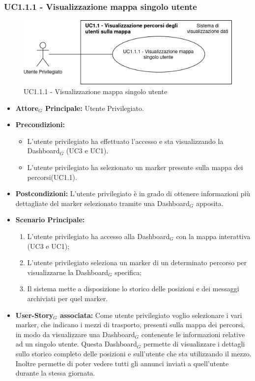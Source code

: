 \documentclass[11pt]{article}
\begin{document}
\begin{justify}
\subsubsection{\textbf{UC1.1.1 - Visualizzazione mappa singolo utente}}
\begin{figure}[H]
    \centering
    \includegraphics[width=0.7\linewidth]{UC1.1.1image.png}
    \caption{UC1.1.1 - Visualizzazione mappa singolo utente}
    \label{fig:UC1.1.1}
\end{figure}
\label{UC1.1.1}
\begin{itemize}
     \item \textbf{Attore$_G$ Principale:} Utente Privilegiato.
     \item \textbf{Precondizioni:}
        \begin{itemize}
    		\item L'utente privilegiato ha effettuato l'accesso e sta      visualizzando la Dashboard$_G$ (UC3 e UC1).
    	        \item L'utente privilegiato ha selezionato un marker  presente sulla mappa dei percorsi(UC1.1).
        \end{itemize}
     \item \textbf{Postcondizioni:} L'utente privilegiato è in grado di ottenere informazioni più dettagliate del marker selezionato tramite una Dashboard$_G$ apposita.
     \item \textbf{Scenario Principale:}
        \begin{enumerate}
            \item L'utente privilegiato ha accesso alla Dashboard$_G$ con la mappa interattiva (UC3 e UC1);
            \item L'utente privilegiato seleziona un marker di un determinato percorso per visualizzarne la Dashboard$_G$ specifica;
            \item Il sistema mette a disposizione lo storico delle posizioni e dei messaggi archiviati per quel marker.
        \end{enumerate}
     \item \textbf{User-Story$_G$ associata:}
     Come utente privilegiato voglio selezionare i vari marker, che indicano i mezzi di trasporto, presenti sulla mappa dei percorsi, in modo da visualizzare una Dashboard$_G$ contenente le informazioni relative ad un singolo utente. Questa Dashboard$_G$ permette di visualizzare i dettagli sullo storico completo delle posizioni e sull'utente che sta utilizzando il mezzo. Inoltre permette di poter vedere tutti gli annunci inviati a quell'utente durante la stessa giornata.
\end{itemize}


\end{justify}
\end{document}
